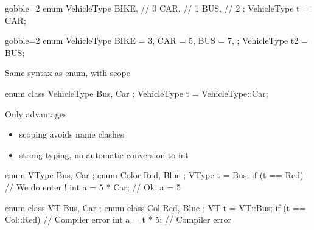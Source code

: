 \begin{frame}[fragile]
  \begin{multicols}{2}
    \begin{cppcode*}{gobble=2}
      enum VehicleType {
        BIKE,  // 0
        CAR,   // 1
        BUS,   // 2
      };
      VehicleType t = CAR;
    \end{cppcode*}
    \columnbreak
    \begin{cppcode*}{gobble=2}
      enum VehicleType {
        BIKE = 3,
        CAR = 5,
        BUS = 7,
      };
      VehicleType t2 = BUS;
    \end{cppcode*}
  \end{multicols}
\end{frame}

\begin{frame}[fragile]
  \begin{block}{Same syntax as enum, with scope}
    \begin{cppcode*}{}
      enum class VehicleType { Bus, Car };
      VehicleType t = VehicleType::Car;
    \end{cppcode*}
  \end{block}
  \pause
  \begin{exampleblock}{Only advantages}
    \begin{itemize}
    \item scoping avoids name clashes
    \item strong typing, no automatic conversion to int
    \end{itemize}
    \small
    \begin{cppcode*}{}
      enum VType { Bus, Car }; enum Color { Red, Blue };
      VType t = Bus;
      if (t == Red) {  // We do enter !  }
      int a = 5 * Car; // Ok, a = 5

      enum class VT { Bus, Car }; enum class Col { Red, Blue };
      VT t = VT::Bus;
      if (t == Col::Red) { // Compiler error }
      int a = t * 5;       // Compiler error
    \end{cppcode*}
  \end{exampleblock}
\end{frame}

